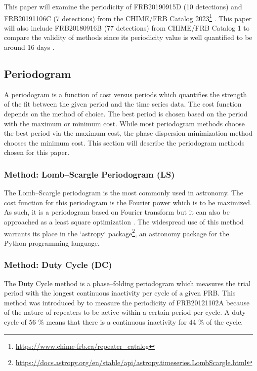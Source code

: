 \documentclass[reprint,amsmath,amssymb,showkeys,prd]{revtex4-2}
\begin{document}
This paper will examine the periodicity of FRB20190915D (10 detections) and FRB20191106C (7 detections) from the CHIME/FRB Catalog 2023\footnote{\url{https://www.chime-frb.ca/repeater_catalog}}  \cite{andersen_CHIMEFRBDiscovery_2023}.
This paper will also include FRB20180916B (77 detections) from CHIME/FRB Catalog 1\footnotemark[1]\cite{thechimefrbcollaborationFirstCHIMEFRB2021}  to compare the validity of methods since its periodicity value is well quantified to be around 16 days \cite{thechimefrbcollaborationPeriodicActivityFast2020, sand_CHIMEFRBStudy_2023}.

\subsection{Periodogram}

A periodogram is a function of cost versus periods which quantifies the strength of the fit between the given period and the time series data.
The cost function depends on the method of choice.
The best period is chosen based on the period with the maximum or minimum cost.
While most periodogram methods choose the best period via the maximum cost, the phase dispersion minimization method chooses the minimum cost.
This section will describe the periodogram methods chosen for this paper.

\subsubsection{Method: Lomb--Scargle Periodogram (LS)}

The Lomb--Scargle periodogram \citet{lomb_LeastSquaresFrequencyAnalysis_1976, scargle_StudiesAstronomicalTime_1982} is the most commonly used in astronomy.
The cost function for this periodogram is the Fourier power which is to be maximized.
As such, it is a periodogram based on Fourier transform but it can also be approached as a least square optimization  \cite{vanderplas_UnderstandingLombScargle_2018} .
The widespread use of this method warrants its place in the `astropy` package\footnote{\url{https://docs.astropy.org/en/stable/api/astropy.timeseries.LombScargle.html}}, an astronomy package for the Python programming language.

\subsubsection{Method: Duty Cycle (DC)}

The Duty Cycle method is a phase--folding periodogram which measures the trial period with the longest continuous inactivity per cycle of a given FRB.
This method was introduced by \citet{rajwade_PossiblePeriodicActivity_2020} to measure the periodicity of FRB20121102A because of the nature of repeaters to be active within a certain period per cycle.
A duty cycle of 56 \% means that there is a continuous inactivity for 44 \% of the cycle.
\end{document}
